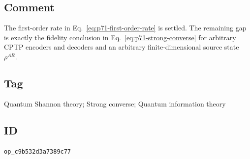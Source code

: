 \subsection*{Comment}

The first-order rate in Eq.~\eqref{eq:p71-first-order-rate} is settled.  The
remaining gap is exactly the fidelity conclusion in
Eq.~\eqref{eq:p71-strong-converse} for arbitrary CPTP encoders and decoders
and an arbitrary finite-dimensional source state $\rho^{AR}$.

\subsection*{Tag}

Quantum Shannon theory; Strong converse; Quantum information theory

\subsection*{ID}

\texttt{op\_c9b532d3a7389c77}
